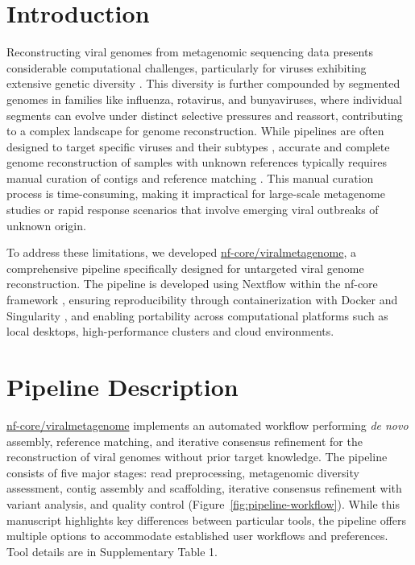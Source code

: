 
\section{Introduction}
Reconstructing viral genomes from metagenomic sequencing data presents considerable computational challenges, particularly for viruses exhibiting extensive genetic diversity \citep{Baaijens2017-hw,Deng2021-nl,Meleshko2021-gb}. This diversity is further compounded by segmented genomes in families like influenza, rotavirus, and bunyaviruses, where individual segments can evolve under distinct selective pressures and reassort, contributing to a complex landscape for genome reconstruction. While pipelines are often designed to target specific viruses and their subtypes \citep{Shepard2016-uh}, accurate and complete genome reconstruction of samples with unknown references typically requires manual curation of contigs and reference matching \citep{Tomkins-Tinch2017-qi,de_Vries2021-po}. This manual curation process is time-consuming, making it impractical for large-scale metagenome studies or rapid response scenarios that involve emerging viral outbreaks of unknown origin.

To address these limitations, we developed \href{https://github.com/nf-core/viralmetagenome}{nf-core/viralmetagenome}, a comprehensive pipeline specifically designed for untargeted viral genome reconstruction. The pipeline is developed using Nextflow \citep{Di-Tommaso2017-nz} within the nf-core framework \citep{Ewels2020-kk}, ensuring reproducibility through containerization with Docker \citep{Merkel2014-hn} and Singularity \citep{Kurtzer2017-iw}, and enabling portability across computational platforms such as local desktops, high-performance clusters and cloud environments.

\section{Pipeline Description}

\href{https://github.com/nf-core/viralmetagenome}{nf-core/viralmetagenome} implements an automated workflow performing \textit{de novo} assembly, reference matching, and iterative consensus refinement for the reconstruction of  viral genomes without prior target knowledge. The pipeline consists of five major stages: read preprocessing, metagenomic diversity assessment, contig assembly and scaffolding, iterative consensus refinement with variant analysis, and quality control (Figure~\ref{fig:pipeline-workflow}). While this manuscript highlights key differences between particular tools, the pipeline offers multiple options to accommodate established user workflows and preferences. Tool details are in Supplementary Table 1.

